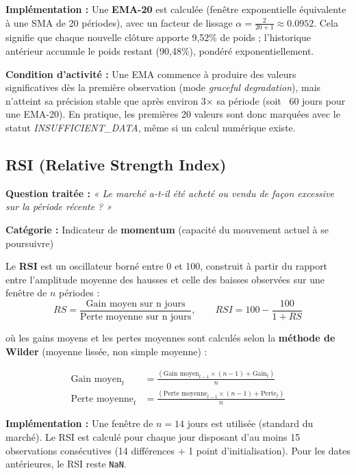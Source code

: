 \documentclass{rapportENSIAS} %
\begin{document}
\vspace{0.2cm}
\noindent
\textbf{Implémentation :} Une \textbf{EMA-20} est calculée (fenêtre exponentielle équivalente à une SMA de 20 périodes), avec un facteur de lissage $\alpha = \frac{2}{20+1} \approx 0.0952$. Cela signifie que chaque nouvelle clôture apporte 9,52\% de poids ; l'historique antérieur accumule le poids restant (90,48\%), pondéré exponentiellement.

\vspace{0.2cm}
\noindent
\textbf{Condition d'activité :} Une EMA commence à produire des valeurs significatives dès la première observation (mode \textit{graceful degradation}), mais n'atteint sa précision stable que après environ 3× sa période (soit ~60 jours pour une EMA-20). En pratique, les premières 20 valeurs sont donc marquées avec le statut \textit{INSUFFICIENT\_DATA}, même si un calcul numérique existe.

\subsection{RSI (Relative Strength Index)}

\noindent
\textbf{Question traitée :} \textit{« Le marché a-t-il été acheté ou vendu de façon excessive sur la période récente ? »}

\vspace{0.2cm}
\noindent
\textbf{Catégorie :} Indicateur de \textbf{momentum} (capacité du mouvement actuel à se poursuivre)

\vspace{0.2cm}
\noindent
Le \textbf{RSI} est un oscillateur borné entre 0 et 100, construit à partir du rapport entre l'amplitude moyenne des hausses et celle des baisses observées sur une fenêtre de $n$ périodes :
\[
RS = \frac{\text{Gain moyen sur n jours}}{\text{Perte moyenne sur n jours}}, \qquad RSI = 100 - \frac{100}{1+RS}
\]

\noindent
où les gains moyens et les pertes moyennes sont calculés selon la \textbf{méthode de Wilder} (moyenne lissée, non simple moyenne) :

\begin{align*}
\text{Gain moyen}_t &= \frac{(\text{Gain moyen}_{t-1} \times (n-1) + \text{Gain}_{t})}{n} \\
\text{Perte moyenne}_t &= \frac{(\text{Perte moyenne}_{t-1} \times (n-1) + \text{Perte}_{t})}{n}
\end{align*}

\vspace{0.2cm}
\noindent
\textbf{Implémentation :} Une fenêtre de $n = 14$ jours est utilisée (standard du marché). Le RSI est calculé pour chaque jour disposant d'au moins 15 observations consécutives (14 différences + 1 point d'initialisation). Pour les dates antérieures, le RSI reste \texttt{NaN}.
\end{document}
